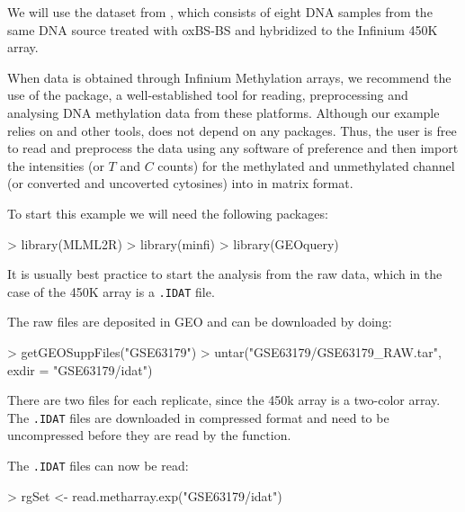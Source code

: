 \documentclass{article}
\begin{document}
We will use the dataset from \cite{10.1371/journal.pone.0118202}, which consists of eight DNA samples from the same DNA source treated with oxBS-BS and hybridized to the Infinium 450K array.

When data is obtained through Infinium Methylation arrays, we recommend the use of the  package, a well-established tool for reading, preprocessing and analysing DNA methylation data from these platforms. Although our example relies on  and other \Bioconductor{} tools,  does not depend on any packages. Thus, the user is free to read and preprocess the data using any software of preference and then import the intensities (or $T$ and $C$ counts) for the methylated and unmethylated channel (or converted and uncoverted cytosines) into \R{} in matrix format.

To start this example we will need the following packages:
\begin{Schunk}
\begin{Sinput}
> library(MLML2R)
> library(minfi)
> library(GEOquery)
\end{Sinput}
\end{Schunk}


It is usually best practice to start the analysis from the raw data, which in the case of the 450K array is a \verb|.IDAT| file.

The raw files are deposited in GEO and can be downloaded by doing:
\begin{Schunk}
\begin{Sinput}
> getGEOSuppFiles("GSE63179")
> untar("GSE63179/GSE63179_RAW.tar", exdir = "GSE63179/idat")
\end{Sinput}
\end{Schunk}

There are two files for each replicate, since the 450k array is a two-color array. The \verb|.IDAT| files are downloaded in compressed format and need to be uncompressed before they are read by the  function.
\begin{Schunk}
\end{Schunk}

The \verb|.IDAT| files can now be read:
\begin{Schunk}
\begin{Sinput}
> rgSet <- read.metharray.exp("GSE63179/idat")
\end{Sinput}
\end{Schunk}
\end{document}
